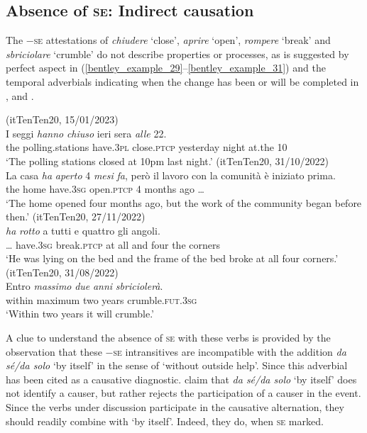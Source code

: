 \documentclass[output=paper,colorlinks,citecolor=brown
]{langscibook}
\begin{document}
\subsection{Absence of \textsc{se}: Indirect causation}
\label{bentley_section_4.2}
The −\textsc{se} attestations of \textit{chiudere} ‘close’, \textit{aprire} ‘open’, \textit{rompere} ‘break’ and \textit{sbriciolare} ‘crumble’ do not describe properties or processes, as is suggested by perfect aspect in (\ref{bentley_example_29}--\ref{bentley_example_31}) and the temporal adverbials indicating when the change has been or will be completed in ,  and .

\ea \label{bentley_example_29}(itTenTen20, 15/01/2023)\\
    \gll I			seggi										\textit{hanno}			\textit{chiuso} 				ieri 						sera 		\textit{alle}		22. \\
    the	polling.stations	have.3\textsc{pl}	close.\textsc{ptcp}		yesterday	night	at.the	10 \\
    \glt 	‘The polling stations closed at 10pm last night.’
\ex \label{bentley_example_30}(itTenTen20, 31/10/2022)\\
    \gll La		casa			\textit{ha}						\textit{aperto}				4	\textit{mesi}				\textit{fa}, {però il lavoro con la comunità è iniziato prima.}\\
    			the		home		have.3\textsc{sg}	open.\textsc{ptcp}	4	months	ago {\ldots} \\
    \glt 				‘The home opened four months ago, but the work of the community began before then.’
\ex \label{bentley_example_31}(itTenTen20, 27/11/2022)\\
     \textit{ha}						\textit{rotto}						a		tutti	e				quattro 	gli 	angoli.  \\
    	{\ldots} 	have.3\textsc{sg}	break.\textsc{ptcp}	at	all		and	four				the	corners\\
    \glt 				‘He was lying on the bed and the frame of the bed broke at all four corners.’
\ex \label{bentley_example_32}(itTenTen20, 31/08/2022)\\
    \gll Entro		\textit{massimo}			\textit{due}	\textit{anni}		\textit{sbriciolerà}. \\
    	within	maximum		two	years	crumble.\textsc{fut}.3\textsc{sg} \\
    \glt 				‘Within two years it will crumble.’
\z

A clue to understand the absence of \textsc{se} with these verbs is provided by the observation that these −\textsc{se} intransitives are incompatible with the addition \textit{da sé/da solo} ‘by itself’ in the sense of ‘without outside help’. Since \citet{chierchia1989semantics} this adverbial has been cited as a causative diagnostic. \citet[76--79]{alexiadou2015external}  claim that\textit{ da sé/da solo} ‘by itself’ does not identify a causer, but rather rejects the participation of a causer in the event. Since the verbs under discussion participate in the causative alternation, they should readily combine with ‘by itself’. Indeed, they do, when \textsc{se} marked.
\end{document}
